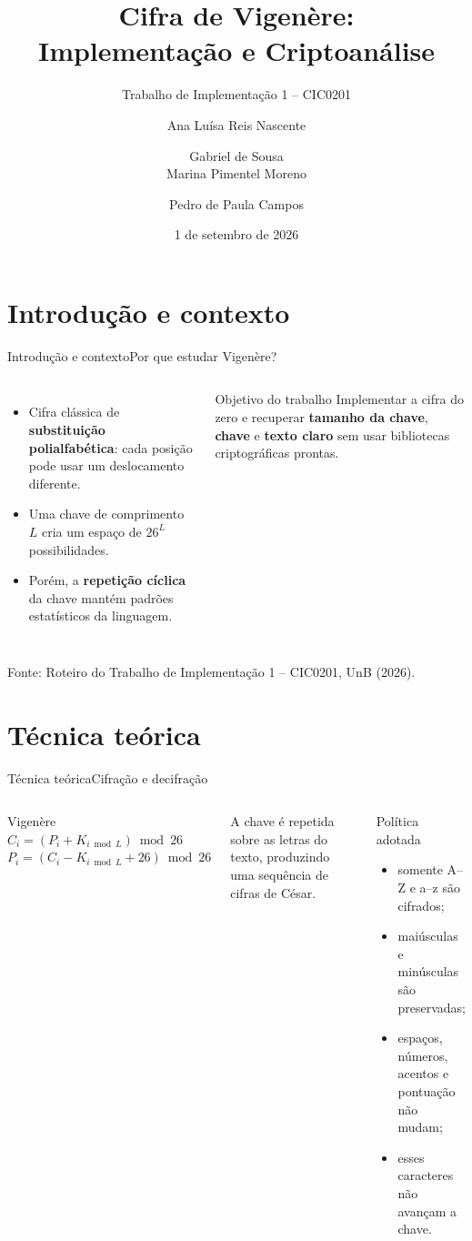 \documentclass[10pt,aspectratio=169]{beamer}
\title[Cifra de Vigenère]{\textbf{Cifra de Vigenère:\\Implementação e Criptoanálise}}
\subtitle[CIC0201]{Trabalho de Implementação 1 -- CIC0201}
\author[Grupo Vigenère]{Ana Luísa Reis Nascente \and Gabriel de Sousa\\Marina Pimentel Moreno \and Pedro de Paula Campos}
\institute[]{Segurança Computacional\\Universidade de Brasília}
\date{1 de setembro de 2026}
\newcommand{\source}[1]{\vfill{\tiny\color{gray}Fonte: #1}}
\begin{document}
{\1
\begin{frame}
  \titlepage
\end{frame}}

\section{Introdução e contexto}
\begin{frame}{Introdução e contexto}{Por que estudar Vigenère?}
  \begin{columns}[T,onlytextwidth]
      \begin{itemize}
        \item Cifra clássica de \textbf{substituição polialfabética}: cada posição pode usar um deslocamento diferente.
        \item Uma chave de comprimento $L$ cria um espaço de $26^L$ possibilidades.
        \item Porém, a \textbf{repetição cíclica} da chave mantém padrões estatísticos da linguagem.
      \end{itemize}
      \begin{block}{Objetivo do trabalho}
        Implementar a cifra do zero e recuperar \textbf{tamanho da chave}, \textbf{chave} e \textbf{texto claro} sem usar bibliotecas criptográficas prontas.
      \end{block}
  \end{columns}
  \source{Roteiro do Trabalho de Implementação 1 -- CIC0201, UnB (2026).}
\end{frame}

\section{Técnica teórica}
\begin{frame}{Técnica teórica}{Cifração e decifração}
  \begin{columns}[T,onlytextwidth]
      \begin{block}{Vigenère}
        \centering
        $C_i=(P_i+K_{i\bmod L})\bmod 26$\\[8pt]
        $P_i=(C_i-K_{i\bmod L}+26)\bmod 26$
      \end{block}
      \vspace{4pt}
      A chave é repetida sobre as letras do texto, produzindo uma sequência de cifras de César.
      \begin{block}{Política adotada}
        \begin{itemize}
          \item somente A--Z e a--z são cifrados;
          \item maiúsculas e minúsculas são preservadas;
          \item espaços, números, acentos e pontuação não mudam;
          \item esses caracteres não avançam a chave.
        \end{itemize}
      \end{block}
  \end{columns}
\end{frame}
\end{document}
